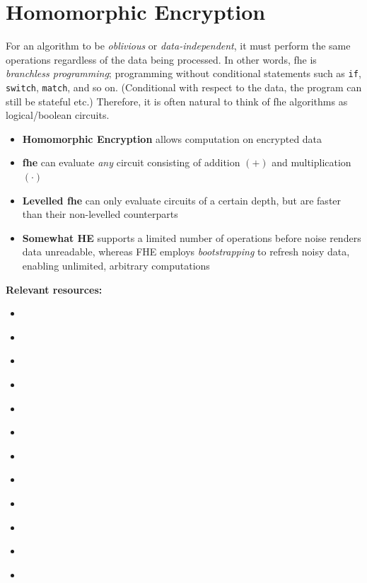 \section{Homomorphic Encryption}

For an algorithm to be \emph{oblivious} or \emph{data-independent}, it must perform the same operations regardless of the data being processed. In other words, \gls{fhe} is \emph{branchless programming}; programming without conditional statements such as \texttt{if}, \texttt{switch}, \texttt{match}, and so on. (Conditional with respect to the data, the program can still be stateful etc.) Therefore, it is often natural to think of \gls{fhe} algorithms as logical/boolean circuits. 

\begin{itemize}
    \item \textbf{Homomorphic Encryption} allows computation on encrypted data
    \item \textbf{\gls{fhe}} can evaluate \emph{any} circuit consisting of addition $(+)$ and multiplication $(\cdot)$
    \item \textbf{Levelled \gls{fhe}} can only evaluate circuits of a certain depth, but are faster than their non-levelled counterparts
    \item \textbf{Somewhat HE} supports a limited number of operations before noise renders data unreadable, whereas FHE employs \emph{bootstrapping} to refresh noisy data, enabling unlimited, arbitrary computations
\end{itemize}

\noindent\textbf{Relevant resources:}
\begin{itemize}
    \item \cite{cryptoeprint:2025/860}
    \item \cite{cryptoeprint:2022/915}
    \item \cite{cryptoeprint:2021/435}
    \item \cite{cryptoeprint:2016/870}
    \item \cite{cryptoeprint:2016/421}
    \item \cite{cryptoeprint:2013/340}
    \item \cite{cryptoeprint:2012/144}
    \item \cite{cryptoeprint:2012/078}
    \item \cite{cryptoeprint:2011/277}
    \item \cite{arxiv:2022/textbook}
    \item \cite{park:sortinghat:2022}
    \item \cite{chillotti:onionring:2019}
\end{itemize}

